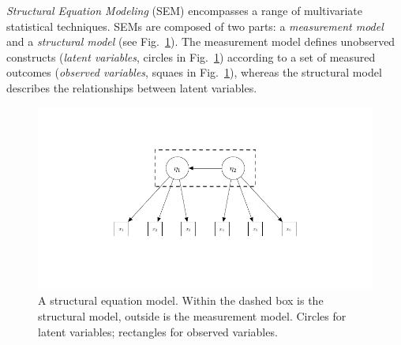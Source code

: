 \documentclass[graybox]{svmult}
\begin{document}
\emph{Structural Equation Modeling} (SEM) encompasses  a range of multivariate statistical techniques. SEMs are composed of two parts: a \emph{measurement model} and a \emph{structural model} (see Fig.~\ref{fig:example_sem}).   The measurement model defines unobserved constructs (\emph{latent variables}, circles in Fig.~\ref{fig:example_sem}) according to a set of measured outcomes (\emph{observed variables}, squaes in Fig.~\ref{fig:example_sem}), whereas the structural model describes the relationships between latent variables.
\begin{figure}[b]
	\sidecaption
	\label{fig:example_sem}
	\includegraphics[width = .45\textwidth]{figure/Plot_SEM}
	\caption{A structural equation model. Within the dashed box is the structural model, outside is the measurement model. Circles for latent variables; rectangles for observed variables.}
\end{figure}



\end{document}

